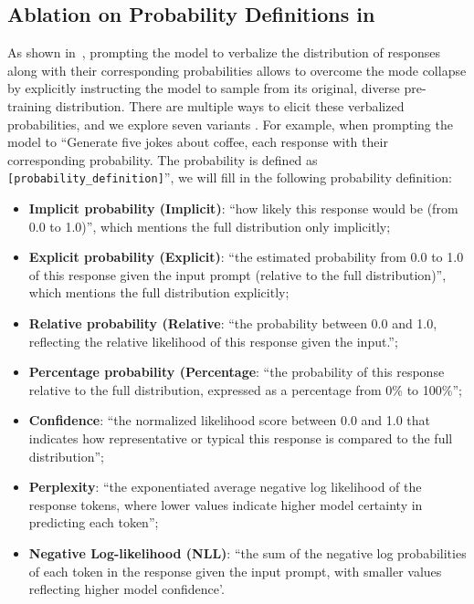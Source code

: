 \clearpage
\subsection{Ablation on Probability Definitions in \ours}\label{sec:ablation_probability_format}
As shown in~, prompting the model to verbalize the distribution of responses along with their corresponding probabilities allows \ours to overcome the mode collapse by explicitly instructing the model to sample from its original, diverse pre-training distribution. There are multiple ways to elicit these verbalized probabilities, and we explore seven variants \cite{yang2024verbalized}. For example, when prompting the model to ``Generate five jokes about coffee, each response with their corresponding probability. The probability is defined as \texttt{[probability\_definition]}'', we will fill in the following probability definition:
\begin{itemize}
    \item \textbf{Implicit probability (Implicit)}: ``how likely this response would be (from 0.0 to 1.0)'', which mentions the full distribution only implicitly; 
    \item \textbf{Explicit probability (Explicit)}: ``the estimated probability from 0.0 to 1.0 of this response given the input prompt (relative to the full distribution)'', which mentions the full distribution explicitly;
    \item \textbf{Relative probability (Relative}: ``the probability between 0.0 and 1.0, reflecting the relative likelihood of this response given the input.''; 
    \item \textbf{Percentage probability (Percentage}: ``the probability of this response relative to the full distribution, expressed as a percentage from 0\% to 100\%'';
    \item \textbf{Confidence}: ``the normalized likelihood score between 0.0 and 1.0 that indicates how representative or typical this response is compared to the full distribution''; 
    \item \textbf{Perplexity}: ``the exponentiated average negative log likelihood of the response tokens, where lower values indicate higher model certainty in predicting each token''; 
    \item \textbf{Negative Log-likelihood (NLL)}: ``the sum of the negative log probabilities of each token in the response given the input prompt, with smaller values reflecting higher model confidence'.
\end{itemize}

